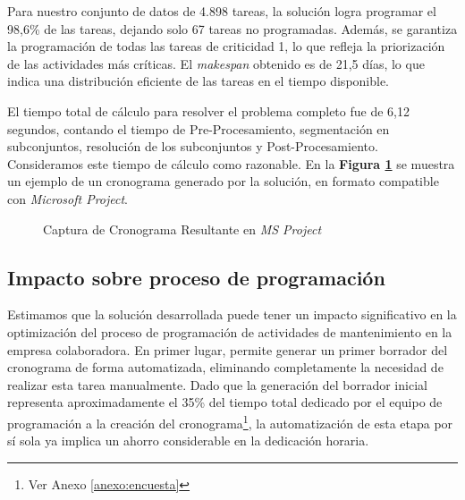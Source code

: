 \documentclass{article}
\begin{document}
Para nuestro conjunto de datos de 4.898 tareas, la solución logra programar el 98,6\% de las tareas, dejando solo 67 tareas no programadas. Además, se garantiza la programación de todas las tareas de criticidad 1, lo que refleja la priorización de las actividades más críticas. El \textit{makespan} obtenido es de 21,5 días, lo que indica una distribución eficiente de las tareas en el tiempo disponible.

El tiempo total de cálculo para resolver el problema completo fue de 6,12 segundos, contando el tiempo de Pre-Procesamiento, segmentación en subconjuntos, resolución de los subconjuntos y Post-Procesamiento. Consideramos este tiempo de cálculo como razonable. En la \textbf{Figura \ref{fig:gantt-project}} se muestra un ejemplo de un cronograma generado por la solución, en formato compatible con \textit{Microsoft Project}.


\begin{figure}[htbp]
    \centering
    \caption{Captura de Cronograma Resultante en \textit{MS Project}}
    \label{fig:gantt-project}
  \end{figure}


\subsection{Impacto sobre proceso de programación}

Estimamos que la solución desarrollada puede tener un impacto significativo en la optimización del proceso de programación de actividades de mantenimiento en la empresa colaboradora. En primer lugar, permite generar un primer borrador del cronograma de forma automatizada, eliminando completamente la necesidad de realizar esta tarea manualmente. Dado que la generación del borrador inicial representa aproximadamente el 35\% del tiempo total dedicado por el equipo de programación a la creación del cronograma\footnote{Ver Anexo \ref{anexo:encuesta}}, la automatización de esta etapa por sí sola ya implica un ahorro considerable en la dedicación horaria.
\end{document}
